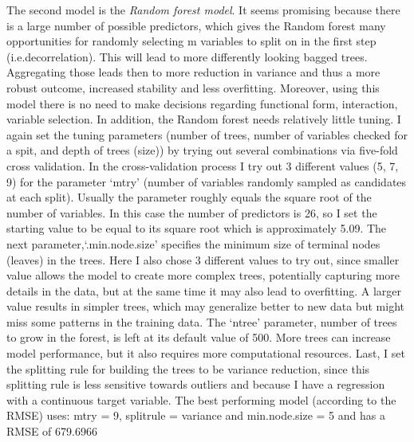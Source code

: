 \documentclass[
]{article}
\begin{document}
The second model is the \emph{Random forest model}. It seems promising
because there is a large number of possible predictors, which gives the
Random forest many opportunities for randomly selecting m variables to
split on in the first step (i.e.decorrelation). This will lead to more
differently looking bagged trees. Aggregating those leads then to more
reduction in variance and thus a more robust outcome, increased
stability and less overfitting. Moreover, using this model there is no
need to make decisions regarding functional form, interaction, variable
selection. In addition, the Random forest needs relatively little
tuning. I again set the tuning parameters (number of trees, number of
variables checked for a spit, and depth of trees (size)) by trying out
several combinations via five-fold cross validation. In the
cross-validation process I try out 3 different values (5, 7, 9) for the
parameter `mtry' (number of variables randomly sampled as candidates at
each split). Usually the parameter roughly equals the square root of the
number of variables. In this case the number of predictors is 26, so I
set the starting value to be equal to its square root which is
approximately 5.09. The next parameter,`.min.node.size' specifies the
minimum size of terminal nodes (leaves) in the trees. Here I also chose
3 different values to try out, since smaller value allows the model to
create more complex trees, potentially capturing more details in the
data, but at the same time it may also lead to overfitting. A larger
value results in simpler trees, which may generalize better to new data
but might miss some patterns in the training data. The `ntree'
parameter, number of trees to grow in the forest, is left at its default
value of 500. More trees can increase model performance, but it also
requires more computational resources. Last, I set the splitting rule
for building the trees to be variance reduction, since this splitting
rule is less sensitive towards outliers and because I have a regression
with a continuous target variable. The best performing model (according
to the RMSE) uses: mtry = 9, splitrule = variance and min.node.size = 5
and has a RMSE of 679.6966
\end{document}
